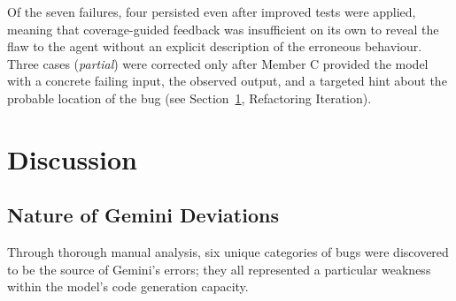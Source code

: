 \documentclass[journal]{IEEEtran}
\begin{document}
Of the seven failures, four persisted even after improved tests were applied,
meaning that coverage-guided feedback was insufficient on its own to reveal
the flaw to the agent without an explicit description of the erroneous
behaviour. Three cases (\textit{partial}) were corrected only after Member C
provided the model with a concrete failing input, the observed output, and a
targeted hint about the probable location of the bug
(see Section~\ref{sec:discuss}, Refactoring Iteration).

\section{Discussion}
\label{sec:discuss}

\subsection{Nature of Gemini Deviations}
Through thorough manual analysis, six unique categories of bugs were discovered to be the source of Gemini's errors; they all represented a particular weakness within the model's code generation capacity.
%
\end{document}

